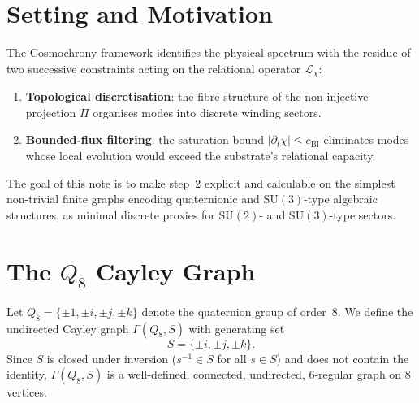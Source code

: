 \documentclass[11pt,a4paper]{article}
\begin{document}
\begin{abstract}
More generally, the results show that bounded substrate capacity can act as a
purely spectral filter favouring low-lying non-abelian sectors of relational
dynamics, and that this mechanism operates uniformly across the $\mathrm{SU}(2)$
and $\mathrm{SU}(3)$ chains.

\medskip
\noindent\textbf{Keywords:} Spectral graph theory, Cayley graphs, Representation theory,
Laplacian spectrum, Dirac--Born--Infeld dynamics, Non-abelian symmetry, Bounded-flux dynamics,
$\mathrm{SU}(3)$, $\mathrm{PSL}(2,7)$, $\Sigma(168)$, finite subgroups
  \end{abstract}

  \clearpage
  \tableofcontents

  \clearpage
\section{Setting and Motivation}

  The Cosmochrony framework identifies the physical spectrum with the residue of two
  successive constraints acting on the relational operator $\mathcal{L}_\chi$:
  \begin{enumerate}
    \item \textbf{Topological discretisation}: the fibre structure of the non-injective
    projection $\Pi$ organises modes into discrete winding sectors.
    \item \textbf{Bounded-flux filtering}: the saturation bound
    $|\partial_t \chi| \leq c_{\mathrm{BI}}$ eliminates modes whose local evolution would
    exceed the substrate's relational capacity.
  \end{enumerate}
  The goal of this note is to make step~2 explicit and calculable on the simplest
  non-trivial finite graphs encoding quaternionic and $\mathrm{SU}(3)$-type algebraic structures,
  as minimal discrete proxies for $\mathrm{SU}(2)$- and $\mathrm{SU}(3)$-type sectors.
\section{The $Q_8$ Cayley Graph}
  \label{sec:q8-}

  Let $Q_8 = \{{\pm 1, \pm i, \pm j, \pm k}\}$ denote the quaternion group of order~8.
  We define the undirected Cayley graph $\Gamma(Q_8, S)$ with generating set
  \begin{equation}
    S = \{\pm i, \pm j, \pm k\}.
  \end{equation}
  Since $S$ is closed under inversion ($s^{-1} \in S$ for all $s \in S$) and does
  not contain the identity, $\Gamma(Q_8, S)$ is a well-defined, connected, undirected,
  $6$-regular graph on $8$ vertices.
\end{document}
